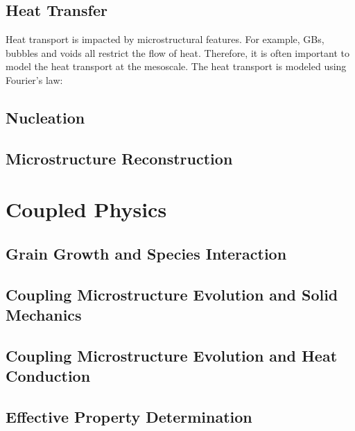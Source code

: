 \documentclass[letter,12pt,fleqn]{article}
\begin{document}
\subsection{Heat Transfer}
Heat transport is impacted by microstructural features. For example, GBs, bubbles and voids all restrict the flow of heat. Therefore, it is often important to model the heat transport at the mesoscale. The heat transport is modeled using Fourier's law:

\subsection{Nucleation}

\subsection{Microstructure Reconstruction} \label{sec:microstructure_reconstruction}

\section{Coupled Physics}

\subsection{Grain Growth and Species Interaction}

\subsection{Coupling Microstructure Evolution and Solid Mechanics}

\subsection{Coupling Microstructure Evolution and Heat Conduction}

\subsection{Effective Property Determination}
\end{document}
